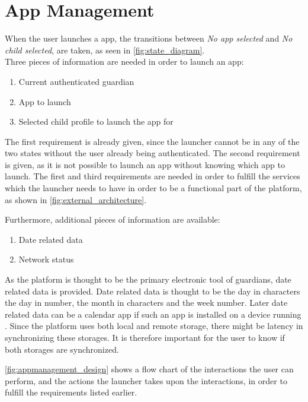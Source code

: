 \section{App Management}
\label{sec:app_management}
\label{sec:appman_solution}
\label{sec:appman_requirements}

When the user launches a \giraf[] app, the transitions between \emph{No app selected} and \emph{No child selected}, are taken, as seen in \autoref{fig:state_diagram}.\\

\noindent Three pieces of information are needed in order to launch an app:

\begin{enumerate}
	\item Current authenticated guardian
	\item App to launch
	\item Selected child profile to launch the app for
\end{enumerate}

The first requirement is already given, since the launcher cannot be in any of the two states without the user already being authenticated.
The second requirement is given, as it is not possible to launch an app without knowing which app to launch.
The first and third requirements are needed in order to fulfill the services which the launcher needs to have in order to be a functional part of the \giraf[] platform, as shown in \autoref{fig:external_architecture}.

Furthermore, additional pieces of information are available:

\begin{enumerate}
	\item Date related data
	\item Network status 
\end{enumerate}

As the \giraf[] platform is thought to be the primary electronic tool of guardians, date related data is provided. Date related data is thought to be the day in characters the day in number, the month in characters and the week number. Later date related data can be a calendar app if such an app is installed on a device running \giraf[].
Since the \giraf[] platform uses both local and remote storage, there might be latency in synchronizing these storages.
It is therefore important for the user to know if both storages are synchronized.

\autoref{fig:appmanagement_design} shows a flow chart of the interactions the user can perform, and the actions the launcher takes upon the interactions, in order to fulfill the requirements listed earlier.\\

